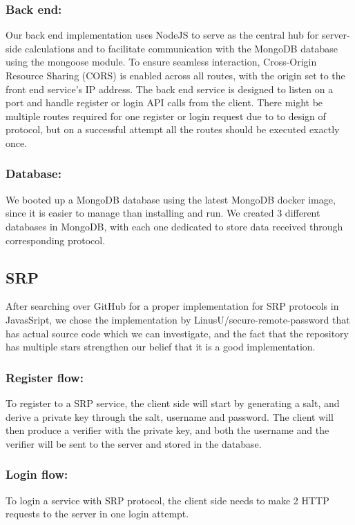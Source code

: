 \subsubsection{Back end:}

Our back end implementation uses NodeJS to serve as the central hub for server-side calculations and to facilitate communication with the MongoDB database using the mongoose module.
To ensure seamless interaction, Cross-Origin Resource Sharing (CORS) is enabled across all routes, with the origin set to the front end service's IP address. 
The back end service is designed to listen on a port and handle register or login API calls from the client. 
There might be multiple routes required for one register or login request due to to design of protocol, but on a successful attempt all the routes should be executed exactly once.

\subsubsection{Database:}
We booted up a MongoDB database using the latest MongoDB docker image, since it is easier to manage than installing and run. 
We created 3 different databases in MongoDB, with each one dedicated to store data received through corresponding protocol.

\subsection{SRP}
After searching over GitHub for a proper implementation for SRP protocols in JavasSript, we chose the implementation by LinusU/\newline secure-remote-password that has actual source code which we can investigate, and the fact that the repository has multiple stars strengthen our belief that it is a good implementation.~\cite{SRPrepo}

\subsubsection{Register flow:}
To register to a SRP service, the client side will start by generating a salt, and derive a private key through the salt, username and password.
The client will then produce a verifier with the private key, and both the username and the verifier will be sent to the server and stored in the database.


\subsubsection{Login flow:}
To login a service with SRP protocol, the client side needs to make 2 HTTP requests to the server in one login attempt. 

